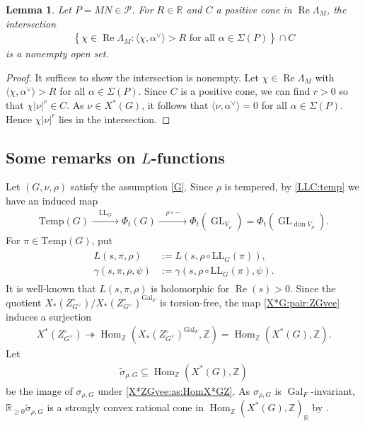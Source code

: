 \documentclass[10pt]{amsart}
\newtheorem{lemma}[theorem]{Lemma}
\theoremstyle{definition}
\numberwithin{equation}{section}
\DeclareMathOperator{\Hom}{\mathrm{Hom}}
\DeclareMathOperator{\GL}{\mathrm{GL}}
\DeclareMathOperator{\Gal}{\mathrm{Gal}}
\numberwithin{equation}{subsection}
\newcommand{\RR}{\mathbb{R}}
\newcommand{\Temp}{\mathrm{Temp}}
\renewcommand{\Re}{\mathop{\mathrm{Re}}}
\begin{document}
\begin{lemma}\label{intertwining:posCone}
   Let $P=MN\in \mathcal{P}$. For $R\in\mathbb{R}$ and $C$ a positive cone in $\Re\Lambda_M$, the intersection
   \begin{align*}
       \left\{\chi\in\Re\Lambda_M: \langle\chi,\alpha^\vee\rangle > R\text{ for all }\alpha\in \Sigma(P)\right\} \cap C
   \end{align*}
   is a nonempty open set.
\end{lemma}
\begin{proof} It suffices to show the intersection is nonempty. Let $\chi\in\Re\Lambda_M$ with $\langle\chi,\alpha^\vee\rangle>R$ for all $\alpha\in \Sigma(P)$. Since $C$ is a positive cone, we can find $r>0$ so that $\chi|\nu|^r\in C$. As $\nu\in X^*(G)$, it follows that $\langle \nu,\alpha^\vee\rangle = 0$ for all $\alpha\in \Sigma(P)$. Hence $\chi|\nu|^r$ lies in the intersection.
\end{proof}


\subsection{Some remarks on $L$-functions}\label{ssec:LLC}
Let $(G,\nu,\rho)$ satisfy the assumption \eqref{G}. Since $\rho$ is tempered, by \eqref{LLC:temp} we have an induced map
\begin{align*}
    \mathrm{Temp}(G)\xrightarrow{\quad\mathrm{LL}_G\quad}\Phi_t(G)\xrightarrow{\quad\rho\circ-\quad} \Phi_t(\GL_{V_\rho}) = \Phi_t(\GL_{\dim V_\rho}).
\end{align*}
For $\pi\in \Temp(G)$, put
\begin{align}\label{eq:Lgamma:LL}
\begin{split}
    L(s,\pi,\rho)&:=L(s,\rho\circ \mathrm{LL}_G(\pi)),\\
    \gamma(s,\pi,\rho,\psi)&:=\gamma(s,\rho\circ \mathrm{LL}_G(\pi),\psi).
\end{split}
\end{align}
It is well-known that $L(s,\pi,\rho)$ is holomorphic for $\Re(s)>0.$ Since the quotient $X_*(Z_{G^\vee}^\circ)/X_*(Z_{G^\vee}^\circ)^{\Gal_F}$ is torsion-free, the map \eqref{X*G:pair:ZGvee} induces a surjection
\begin{align}\label{X*ZGvee:as:HomX*GZ}
    X^*(Z^\circ_{G^\vee})\twoheadrightarrow \Hom_{\mathbb{Z}}(X_*(Z_{G^\vee}^\circ)^{\Gal_F},\mathbb{Z})=\Hom_{\mathbb{Z}}(X^*(G),\mathbb{Z}).
\end{align}
 Let
\begin{align*}
    \widetilde{\sigma}_{\rho,G} \subseteq \Hom_{\mathbb{Z}}(X^*(G),\mathbb{Z})
\end{align*}
be the image of $\sigma_{\rho,G}$ under \eqref{X*ZGvee:as:HomX*GZ}. As $\sigma_{\rho,G}$ is $\Gal_F$-invariant,  $\mathbb{R}_{\geq 0}\widetilde{\sigma}_{\rho,G}$ is a strongly convex rational cone in $\Hom_{\mathbb{Z}}(X^*(G),\mathbb{Z})_\RR$ by \cite[Lemma 6.11]{DRS}.
\end{document}

